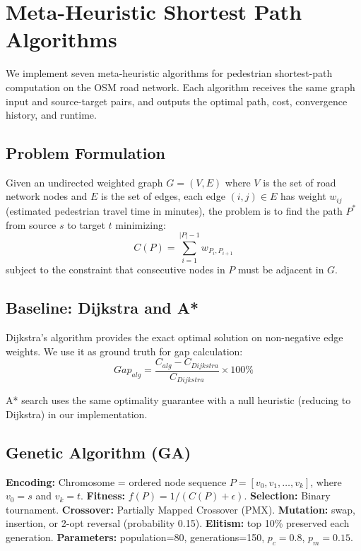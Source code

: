 \documentclass[journal]{IEEEtran}
\begin{document}
\section{Meta-Heuristic Shortest Path Algorithms}
\label{sec:algorithms}

We implement seven meta-heuristic algorithms for pedestrian shortest-path computation on the OSM road network. Each algorithm receives the same graph input and source-target pairs, and outputs the optimal path, cost, convergence history, and runtime.

\subsection{Problem Formulation}
Given an undirected weighted graph $G=(V,E)$ where $V$ is the set of road network nodes and $E$ is the set of edges, each edge $(i,j) \in E$ has weight $w_{ij}$ (estimated pedestrian travel time in minutes), the problem is to find the path $P^*$ from source $s$ to target $t$ minimizing:
\begin{equation}
\label{eq:path_cost}
C(P) = \sum_{i=1}^{|P|-1} w_{P_i, P_{i+1}}
\end{equation}
subject to the constraint that consecutive nodes in $P$ must be adjacent in $G$.

\subsection{Baseline: Dijkstra and A*}
Dijkstra's algorithm provides the exact optimal solution on non-negative edge weights. We use it as ground truth for gap calculation:
\begin{equation}
\label{eq:gap}
Gap_{alg} = \frac{C_{alg} - C_{Dijkstra}}{C_{Dijkstra}} \times 100\%
\end{equation}

A* search uses the same optimality guarantee with a null heuristic (reducing to Dijkstra) in our implementation.

\subsection{Genetic Algorithm (GA)}
\textbf{Encoding:} Chromosome = ordered node sequence $P = [v_0, v_1, \ldots, v_k]$, where $v_0=s$ and $v_k=t$. \textbf{Fitness:} $f(P) = 1/(C(P) + \epsilon)$. \textbf{Selection:} Binary tournament. \textbf{Crossover:} Partially Mapped Crossover (PMX). \textbf{Mutation:} swap, insertion, or 2-opt reversal (probability 0.15). \textbf{Elitism:} top 10\% preserved each generation. \textbf{Parameters:} population=80, generations=150, $p_c=0.8$, $p_m=0.15$.
\end{document}
